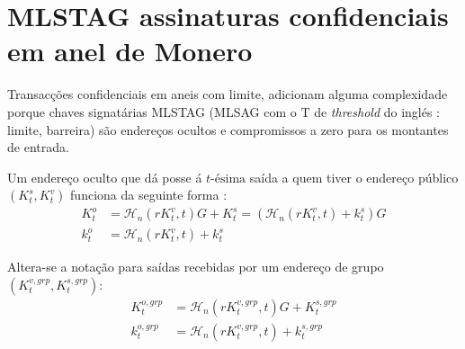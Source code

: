 


\section{MLSTAG assinaturas confidenciais em anel de Monero}
\label{sec:MLSTAG-RingCT}

Transacções confidenciais em aneis com limite, adicionam alguma complexidade porque chaves signatárias MLSTAG (MLSAG com o T de {\em threshold} do inglés : limite, barreira) são endereços ocultos e compromissos a zero para os montantes de entrada.
 

Um endereço oculto que dá posse á $t\textrm{-ésima}$ saída a quem tiver o endereço público $(K^s_t, K^v_t)$ funciona da seguinte forma :
\begin{align*}
  K_t^o &= \mathcal{H}_n(r K_t^v, t)G + K_t^s = (\mathcal{H}_n(r K_t^v, t) + k_t^s)G  \\ 
  k_t^o &= \mathcal{H}_n(r K_t^v, t) + k_t^s
\end{align*} 

Altera-se a notação para saídas recebidas por um endereço de grupo $(K^{v,grp}_t,K^{s,grp}_t)$:
\begin{align*}
  K^{o,grp}_t &= \mathcal{H}_n(r K^{v,grp}_t, t)G + K^{s,grp}_t  \\ 
  k^{o,grp}_t &= \mathcal{H}_n(r K^{v,grp}_t, t) + k^{s,grp}_t
\end{align*}

